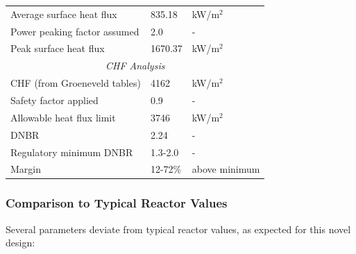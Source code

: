 \begin{table}[H]
\begin{tabular}{|l|l|l|}
Average surface heat flux & 835.18 & kW/m$^2$ \\
Power peaking factor assumed & 2.0 & - \\
Peak surface heat flux & 1670.37 & kW/m$^2$ \\
\hline
\multicolumn{3}{|c|}{\textit{CHF Analysis}} \\
\hline
CHF (from Groeneveld tables) & 4162 & kW/m$^2$ \\
Safety factor applied & 0.9 & - \\
Allowable heat flux limit & 3746 & kW/m$^2$ \\
DNBR & 2.24 & - \\
Regulatory minimum DNBR & 1.3-2.0 & - \\
Margin & 12-72\% & above minimum \\
\hline
\end{tabular}
\end{table}

\subsubsection{Comparison to Typical Reactor Values}

Several parameters deviate from typical reactor values, as expected for this novel design:

